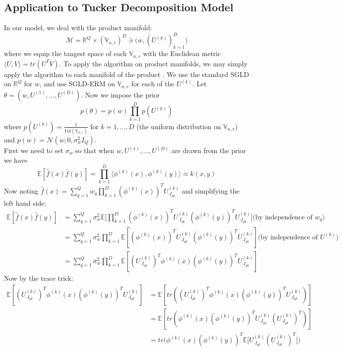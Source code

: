 \documentclass[a4paper,10pt]{article}
\begin{document}
\subsection{Application to Tucker Decomposition Model}
In our model, we deal with the product manifold:
\begin{equation}
\mathcal{M} = \mathbb{R}^Q \times (\mathbb{V}_{n,r})^D \ni \bigg(w,(U^{(k)})_{k=1}^D\bigg)
\end{equation}
where we equip the tangest space of each $\mathbb{V}_{n,r}$ with the Euclidean metric $\langle U,V \rangle=tr(U^TV)$. To apply the algorithm on product manifolds, we may simply apply the algorithm to each manifold of the product \cite{byrne2013geodesic}. We use the standard SGLD on $\mathbb{R}^Q$ for $w$, and use SGLD-ERM on $\mathbb{V}_{n,r}$ for each of the $U^{(k)}$.
Let $\theta = (w,U^{(1)},...,U^{(D)})$. Now we impose the prior
\begin{equation}
p(\theta) = p(w) \prod_{k=1}^D p(U^{(k)})
\end{equation}
where $p(U^{(k)}) = \frac{1}{Vol(\mathbb{V}_{n,r})}$ for $k=1,...,D$ (the uniform distribution on $\mathbb{V}_{n,r}$) and $p(w)=\mathcal{N}(w;0,\sigma_w^2I_Q)$. \\
First we need to set $\sigma_w$ so that when $w,U^{(1)},...,U^{(D)}$ are drawn from the prior we have
\begin{equation}
\mathbb{E}[\hat{f}(x)\hat{f}(y)]=\prod_{k=1}^D \langle \phi^{(k)}(x),\phi^{(k)}(y) \rangle \approx k(x,y)
\end{equation}
Now noting $\hat{f}(x)=\sum_{q=1}^Q w_q \prod_{k=1}^D (\phi^{(k)}(x))^T U^{(k)}_{\cdot I_{qk}}$ and simplifying the left hand side:
\begin{equation}
\begin{split}
\mathbb{E}[\hat{f}(x)\hat{f}(y)]
& = \sum_{q=1}^Q \sigma_w^2 \mathbb{E} \Big[\prod_{k=1}^D (\phi^{(k)}(x))^T U^{(k)}_{\cdot I_{qk}} (\phi^{(k)}(y))^T U^{(k)}_{\cdot I_{qk}} \Big] \text{(by independence of $w_q$)}\\
& = \sum_{q=1}^Q \sigma_w^2 \prod_{k=1}^D \mathbb{E}[(\phi^{(k)}(x))^T U^{(k)}_{\cdot I_{qk}} (\phi^{(k)}(y))^T U^{(k)}_{\cdot I_{qk}}] \text{(by independence of $U^{(k)}$)} \\
& = \sum_{q=1}^Q \sigma_w^2 \prod_{k=1}^D \mathbb{E}[(U^{(k)}_{\cdot I_{qk}})^T\phi^{(k)}(x) (\phi^{(k)}(y))^T U^{(k)}_{\cdot I_{qk}}]
\end{split}
\end{equation}
Now by the trace trick: 
\begin{equation}
\begin{aligned}
\mathbb{E}[(U^{(k)}_{\cdot I_{qk}})^T\phi^{(k)}(x) (\phi^{(k)}(y))^T U^{(k)}_{\cdot I_{qk}}]
& = \mathbb{E}[tr((U^{(k)}_{\cdot I_{qk}})^T\phi^{(k)}(x) (\phi^{(k)}(y))^T U^{(k)}_{\cdot I_{qk}})] \\
& = \mathbb{E}[tr(\phi^{(k)}(x) (\phi^{(k)}(y))^T U^{(k)}_{\cdot I_{qk}}(U^{(k)}_{\cdot I_{qk}})^T )] \\
& = tr\Big(\phi^{(k)}(x) (\phi^{(k)}(y))^T \mathbb{E}\bigg[U^{(k)}_{\cdot I_{qk}}(U^{(k)}_{\cdot I_{qk}})^T\bigg]\Big)
\end{aligned}
\end{equation}
\end{document}
